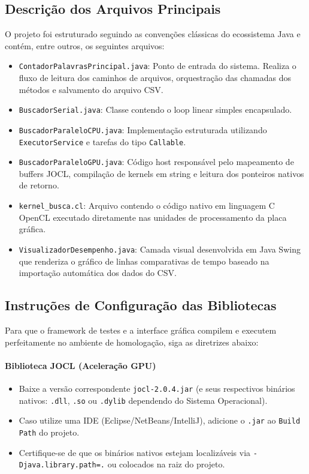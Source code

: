 \documentclass[11pt,a4paper]{article}
\begin{document}
\subsection{Descrição dos Arquivos Principais}
O projeto foi estruturado seguindo as convenções clássicas do ecossistema Java e contém, entre outros, os seguintes arquivos:
\begin{itemize}
	\item \texttt{ContadorPalavrasPrincipal.java}: Ponto de entrada do sistema. Realiza o fluxo de leitura dos caminhos de arquivos, orquestração das chamadas dos métodos e salvamento do arquivo CSV.
	\item \texttt{BuscadorSerial.java}: Classe contendo o loop linear simples encapsulado.
	\item \texttt{BuscadorParaleloCPU.java}: Implementação estruturada utilizando \texttt{ExecutorService} e tarefas do tipo \texttt{Callable}.
	\item \texttt{BuscadorParaleloGPU.java}: Código host responsável pelo mapeamento de buffers JOCL, compilação de kernels em string e leitura dos ponteiros nativos de retorno.
	\item \texttt{kernel\_busca.cl}: Arquivo contendo o código nativo em linguagem C OpenCL executado diretamente nas unidades de processamento da placa gráfica.
	\item \texttt{VisualizadorDesempenho.java}: Camada visual desenvolvida em Java Swing que renderiza o gráfico de linhas comparativas de tempo baseado na importação automática dos dados do CSV.
\end{itemize}

\subsection{Instruções de Configuração das Bibliotecas}
Para que o framework de testes e a interface gráfica compilem e executem perfeitamente no ambiente de homologação, siga as diretrizes abaixo:

\paragraph{Biblioteca JOCL (Aceleração GPU)}
\begin{itemize}
	\item Baixe a versão correspondente \texttt{jocl-2.0.4.jar} (e seus respectivos binários nativos: \texttt{.dll}, \texttt{.so} ou \texttt{.dylib} dependendo do Sistema Operacional).
	\item Caso utilize uma IDE (Eclipse/NetBeans/IntelliJ), adicione o \texttt{.jar} ao \texttt{Build Path} do projeto.
	\item Certifique-se de que os binários nativos estejam localizáveis via \texttt{-Djava.library.path=.} ou colocados na raiz do projeto.
\end{itemize}
\end{document}
